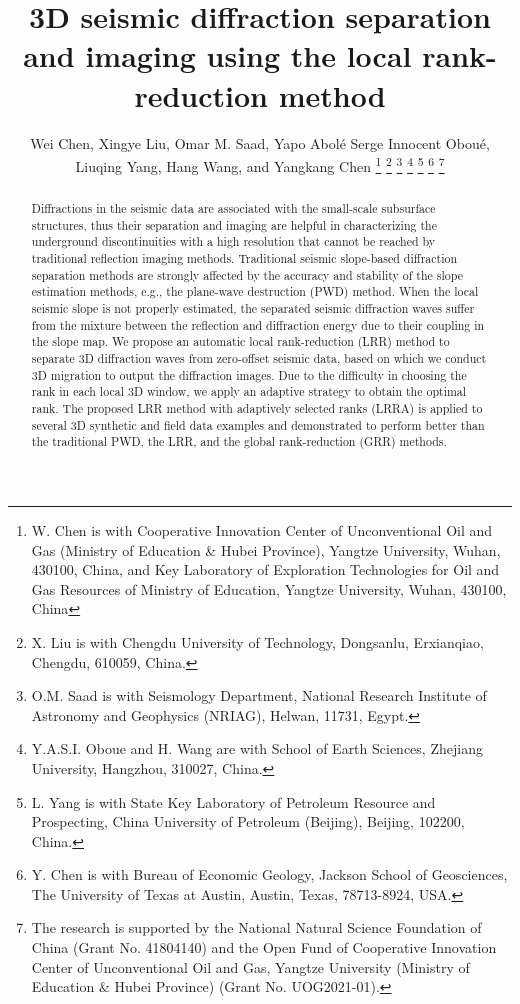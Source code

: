 \documentclass[10pt]{IEEEtran}
\begin{document}
\title{3D seismic diffraction separation and imaging using the local rank-reduction method}
\renewcommand{\thefootnote}{\fnsymbol{footnote}}
\author{Wei Chen, Xingye Liu, Omar M. Saad, Yapo Abol{\'e} Serge Innocent Obou{\'e}, Liuqing Yang, Hang Wang, and Yangkang Chen
\thanks{W. Chen is with Cooperative Innovation Center of Unconventional Oil and Gas (Ministry of Education \& Hubei Province), Yangtze University, Wuhan, 430100, China, and Key Laboratory of Exploration Technologies for Oil and Gas Resources of Ministry of Education, Yangtze University, Wuhan, 430100, China}
\thanks{X. Liu is with Chengdu University of Technology, Dongsanlu, Erxianqiao, Chengdu, 610059, China.}
\thanks{O.M. Saad is with Seismology Department, National Research Institute of Astronomy and Geophysics (NRIAG), Helwan, 11731, Egypt.}
\thanks{Y.A.S.I. Oboue and H. Wang are with School of Earth Sciences, Zhejiang University, Hangzhou, 310027, China.}
\thanks{L. Yang is with State Key Laboratory of Petroleum Resource and Prospecting, China University of Petroleum (Beijing), Beijing, 102200, China.}
\thanks{Y. Chen is with Bureau of Economic Geology, Jackson School of Geosciences, The University of Texas at Austin, Austin, Texas, 78713-8924, USA.}
\thanks{The research is supported by the National Natural Science Foundation of China (Grant No. 41804140) and the Open Fund of Cooperative Innovation Center of Unconventional Oil and Gas, Yangtze University (Ministry of Education \& Hubei Province) (Grant No. UOG2021-01).}}

\maketitle

\begin{abstract}
Diffractions in the seismic data are associated with the small-scale subsurface structures, thus their separation and imaging are helpful in characterizing the underground discontinuities with a high resolution that cannot be reached by traditional reflection imaging methods. Traditional seismic slope-based diffraction separation methods are strongly affected by the accuracy and stability of the slope estimation methods, e.g., the plane-wave destruction (PWD) method. When the local seismic slope is not properly estimated, the separated seismic diffraction waves suffer from the mixture between the reflection and diffraction energy due to their coupling in the slope map. We propose an automatic local rank-reduction (LRR) method to separate 3D diffraction waves from zero-offset seismic data, based on which we conduct 3D migration to output the diffraction images. Due to the difficulty in choosing the rank in each local 3D window, we apply an adaptive strategy to obtain the optimal rank. The proposed LRR method with adaptively selected ranks (LRRA) is applied to several 3D synthetic and field data examples and demonstrated to perform better than the traditional PWD, the LRR, and the global rank-reduction (GRR) methods. 
\end{abstract}
\end{document}
